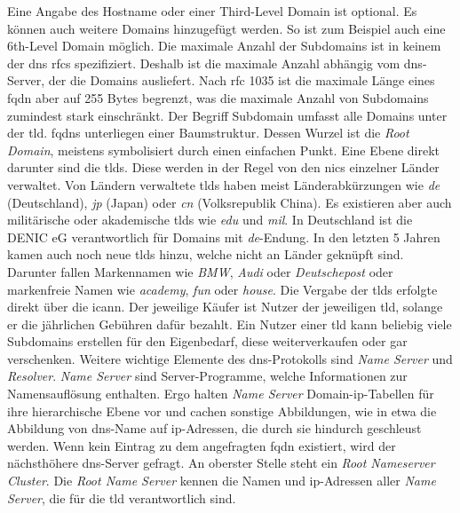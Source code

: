 \documentclass[titlepage]{report}
\begin{document}
Eine Angabe des Hostname oder einer Third-Level
Domain ist optional. Es können auch weitere Domains hinzugefügt werden.
So ist zum Beispiel auch eine 6th-Level Domain möglich. Die maximale Anzahl der
Subdomains ist in keinem der \gls{dns} \glspl{rfc} spezifiziert. Deshalb
ist die maximale Anzahl abhängig vom \gls{dns}\hyp{}Server, der die
Domains ausliefert. Nach \gls{rfc} 1035 ist die maximale Länge eines
\gls{fqdn} aber auf 255 Bytes begrenzt\cite[siehe Section
2.3.4]{RFC1035}, was die maximale Anzahl von Subdomains zumindest stark
einschränkt. Der Begriff Subdomain umfasst alle Domains unter der
\gls{tld}. \glspl{fqdn} unterliegen einer Baumstruktur. Dessen Wurzel ist die
\emph{Root Domain}, meistens symbolisiert durch einen einfachen Punkt.
Eine Ebene direkt darunter sind die \glspl{tld}. Diese
werden in der Regel von den \glspl{nic} einzelner Länder verwaltet. Von
Ländern verwaltete \glspl{tld} haben meist Länderabkürzungen wie
\emph{de} (Deutschland), \emph{jp} (Japan) oder \emph{cn} (Volksrepublik
China). Es existieren aber auch militärische oder akademische
\glspl{tld} wie \emph{edu} und \emph{mil}. In Deutschland ist die DENIC eG
verantwortlich für Domains mit \emph{de}\hyp{}Endung.
In den letzten 5 Jahren kamen auch noch neue \glspl{tld} hinzu, welche
nicht an Länder geknüpft sind. Darunter fallen Markennamen wie
\emph{BMW}, \emph{Audi} oder \emph{Deutschepost} oder markenfreie Namen
wie \emph{academy}, \emph{fun} oder \emph{house}\cite{NEWTLDLIST}. Die
Vergabe der \glspl{tld} erfolgte direkt über die \gls{icann}. Der jeweilige
Käufer ist Nutzer der jeweiligen \gls{tld}, solange er die jährlichen
Gebühren dafür bezahlt. Ein Nutzer einer \gls{tld} kann beliebig viele Subdomains erstellen für den
Eigenbedarf, diese weiterverkaufen oder gar verschenken. Weitere
wichtige Elemente des \gls{dns}\hyp{}Protokolls sind \emph{Name Server}
und \emph{Resolver}\cite[siehe Section 2.4]{RFC1034}.
\emph{Name Server} sind Server\hyp{}Programme, welche
Informationen zur Namensauflösung enthalten. Ergo halten \emph{Name
Server} Domain\hyp{}\gls{ip}\hyp{}Tabellen für ihre
hierarchische Ebene vor und cachen sonstige Abbildungen, wie in etwa die
Abbildung von \gls{dns}\hyp{}Name auf \gls{ip}\hyp{}Adressen, die durch sie
hindurch geschleust werden. Wenn kein Eintrag zu dem angefragten \gls{fqdn}
existiert, wird der nächsthöhere \gls{dns}\hyp{}Server gefragt. An
oberster Stelle steht ein \emph{Root Nameserver
Cluster}\cite{ROOTNAMESERVER}. Die \emph{Root
Name Server} kennen die Namen und \gls{ip}\hyp{}Adressen aller
\emph{Name Server}, die für die \gls{tld} verantwortlich sind.
\end{document}
